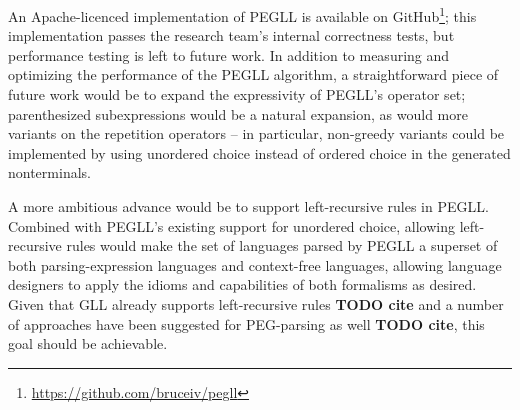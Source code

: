\documentclass{article}
\begin{document}
An Apache-licenced implementation of PEGLL is available on GitHub\footnote{\url{https://github.com/bruceiv/pegll}}; this implementation passes the research team's internal correctness tests, but performance testing is left to future work. 
In addition to measuring and optimizing the performance of the PEGLL algorithm, a straightforward piece of future work would be to expand the expressivity of PEGLL's operator set; parenthesized subexpressions would be a natural expansion, as would more variants on the repetition operators -- in particular, non-greedy variants could be implemented by using unordered choice instead of ordered choice in the generated nonterminals. 

A more ambitious advance would be to support left-recursive rules in PEGLL. 
Combined with PEGLL's existing support for unordered choice, allowing left-recursive rules would make the set of languages parsed by PEGLL a superset of both parsing-expression languages and context-free languages, allowing language designers to apply the idioms and capabilities of both formalisms as desired. 
Given that GLL already supports left-recursive rules \textbf{TODO cite} and a number of approaches have been suggested for PEG-parsing as well \textbf{TODO cite}, this goal should be achievable.



\end{document}
